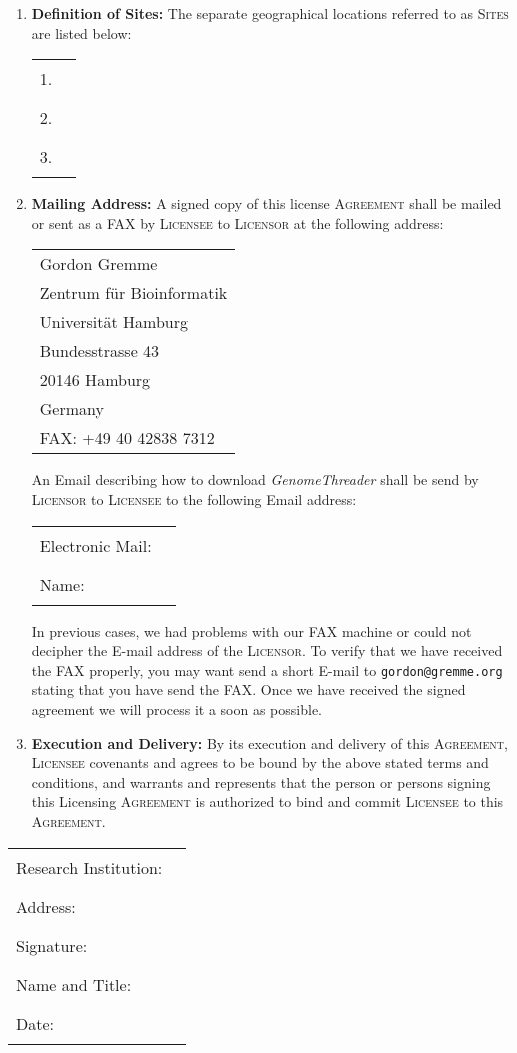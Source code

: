 \documentclass[12pt]{article}
\makeatletter
\newcommand{\Software}[0]{\emph{GenomeThreader}\xspace}
\newcommand{\Email}[0]{\texttt{\small gordon@gremme.org}\xspace}
\newcommand{\Persontocontact}[0]{Gordon Gremme\xspace}
\newcommand{\Licensor}[0]{\textsc{Licensor}\xspace}
\newcommand{\Licensee}[0]{\textsc{Licensee}\xspace}
\newcommand{\Agreement}[0]{\textsc{Agreement}\xspace}
\newcommand{\Sites}[0]{\textsc{Sites}\xspace}
\newcommand{\Fillline}[0]{\rule{10cm}{1pt}}
\newcommand{\Paragraph}[2]{\item \textbf{#1:} #2}
\makeatother
\begin{document}
\begin{enumerate}
\Paragraph{Definition of Sites}{
The separate geographical locations 
referred to as \Sites are listed below:

\begin{center}
\begin{tabular}{ll}
1.&\Fillline\\[5mm]
2.&\Fillline\\[5mm]
3.&\Fillline
\end{tabular}
\end{center}
}
\label{DefSites}

\Paragraph{Mailing Address}{A signed copy of this license \Agreement
shall be mailed or sent as a FAX by \Licensee to \Licensor at the 
following address:

\begin{tabular}{@{}l}
\Persontocontact\\
Zentrum f\"ur Bioinformatik\\
Universit\"at Hamburg\\
Bundesstrasse 43\\
20146 Hamburg\\
Germany\\
FAX: +49 40 42838 7312
\end{tabular}

An Email describing how to download \Software shall be send by \Licensor to 
\Licensee to the following Email address:

\begin{center}
\begin{tabular}{lc}
Electronic Mail:&\Fillline\\[5mm]
Name:&\Fillline
\end{tabular}
\end{center}

In previous cases, we had problems with our FAX machine or could not
decipher the E-mail address of the \Licensor.
To verify that we have received the FAX properly, you may want send a 
short E-mail to \Email stating that you have send the FAX. 
Once we have received the signed agreement we will process it a soon as 
possible. 
}

\Paragraph{Execution and Delivery}{By its execution and delivery of 
this \Agreement, \Licensee covenants and agrees to be bound by the 
above stated terms and conditions, and warrants and represents that 
the person or persons signing this Licensing \Agreement is authorized 
to bind and commit \Licensee to this \Agreement.
}

\end{enumerate}

\begin{center}
\begin{tabular}{lc}
Research Institution:&\Fillline\\[5mm]
Address:&\Fillline\\[5mm]
Signature:&\Fillline\\[5mm]
Name and Title:&\Fillline\\[5mm]
Date:&\Fillline
\end{tabular}
\end{center}
\end{document}
